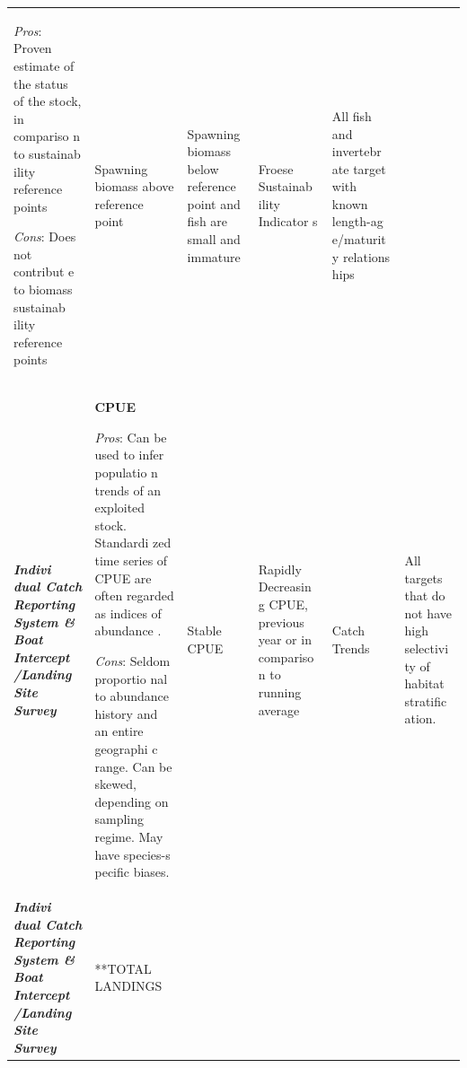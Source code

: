 \documentclass[]{book}
\begin{document}
\begin{longtable}[]{@{}llllll@{}}
\begin{minipage}[t]{0.16\columnwidth}
\emph{Pros}: Proven estimate of the status of the stock, in compariso n
to sustainab ility reference points

\emph{Cons}: Does not contribut e to biomass sustainab ility reference
points\strut
\end{minipage} & \begin{minipage}[t]{0.16\columnwidth}\raggedright\strut
Spawning biomass above reference point\strut
\end{minipage} & \begin{minipage}[t]{0.16\columnwidth}\raggedright\strut
Spawning biomass below reference point and fish are small and
immature\strut
\end{minipage} & \begin{minipage}[t]{0.16\columnwidth}\raggedright\strut
Froese Sustainab ility Indicator s\strut
\end{minipage} & \begin{minipage}[t]{0.16\columnwidth}\raggedright\strut
All fish and invertebr ate target with known length-ag e/maturit y
relations hips\strut
\end{minipage}\tabularnewline
\begin{minipage}[t]{0.16\columnwidth}\raggedright\strut
\textbf{\emph{Indivi dual Catch Reporting System \& Boat Intercept
/Landing Site Survey}}\strut
\end{minipage} & \begin{minipage}[t]{0.16\columnwidth}\raggedright\strut
\textbf{CPUE}

\emph{Pros}: Can be used to infer populatio n trends of an exploited
stock. Standardi zed time series of CPUE are often regarded as indices
of abundance .

\emph{Cons}: Seldom proportio nal to abundance history and an entire
geographi c range. Can be skewed, depending on sampling regime. May have
species-s pecific biases.\strut
\end{minipage} & \begin{minipage}[t]{0.16\columnwidth}\raggedright\strut
Stable CPUE\strut
\end{minipage} & \begin{minipage}[t]{0.16\columnwidth}\raggedright\strut
Rapidly Decreasin g CPUE, previous year or in compariso n to running
average\strut
\end{minipage} & \begin{minipage}[t]{0.16\columnwidth}\raggedright\strut
Catch Trends\strut
\end{minipage} & \begin{minipage}[t]{0.16\columnwidth}\raggedright\strut
All targets that do not have high selectivi ty of habitat stratific
ation.\strut
\end{minipage}\tabularnewline
\begin{minipage}[t]{0.16\columnwidth}\raggedright\strut
\textbf{\emph{Indivi dual Catch Reporting System \& Boat Intercept
/Landing Site Survey}}\strut
\end{minipage} & \begin{minipage}[t]{0.16\columnwidth}\raggedright\strut
**TOTAL LANDINGS\emph{ }


\end{minipage}
\end{longtable}
\end{document}
